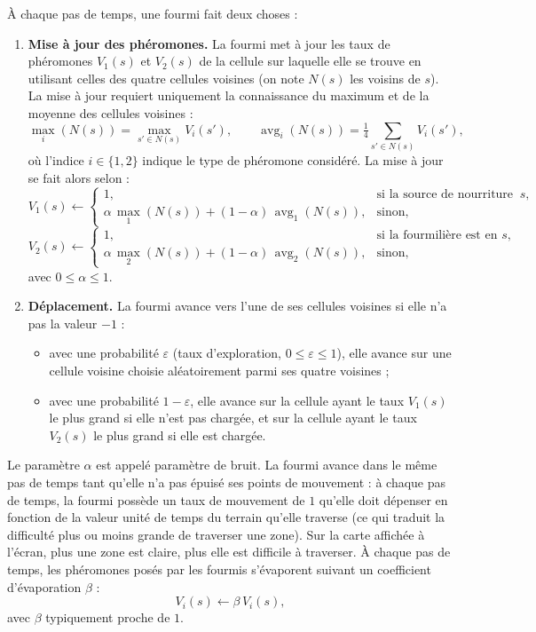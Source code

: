 \documentclass[11pt]{article}
\begin{document}
À chaque pas de temps, une fourmi fait deux choses :
\begin{enumerate}
  \item \textbf{Mise à jour des phéromones.} La fourmi met à jour les taux de phéromones $V_1(s)$ et $V_2(s)$ de la cellule sur laquelle elle se trouve en utilisant celles des quatre cellules voisines (on note $N(s)$ les voisins de $s$). La mise à jour requiert uniquement la connaissance du maximum et de la moyenne des cellules voisines :
  \[
    \max_i(N(s)) = \max_{s' \in N(s)} V_i(s'), \qquad \operatorname{avg}_i(N(s)) = \tfrac{1}{4} \sum_{s' \in N(s)} V_i(s') ,
  \]
  où l'indice $i \in \{1,2\}$ indique le type de phéromone considéré. La mise à jour se fait alors selon :
  \[
    V_1(s) \leftarrow
    \begin{cases}
      1, & \text{si la source de nourriture est en } s, \\
      \alpha\,\max_1(N(s)) + (1-\alpha)\,\operatorname{avg}_1(N(s)), & \text{sinon},
    \end{cases}
  \]
  \[
    V_2(s) \leftarrow
    \begin{cases}
      1, & \text{si la fourmilière est en } s, \\
      \alpha\,\max_2(N(s)) + (1-\alpha)\,\operatorname{avg}_2(N(s)), & \text{sinon},
    \end{cases}
  \]
  avec $0 \leq \alpha \leq 1$.

  \item \textbf{Déplacement.} La fourmi avance vers l'une de ses cellules voisines si elle n'a pas la valeur $-1$ :
  \begin{itemize}
    \item avec une probabilité $\varepsilon$ (taux d'exploration, $0 \leq \varepsilon \leq 1$), elle avance sur une cellule voisine choisie aléatoirement parmi ses quatre voisines ;
    \item avec une probabilité $1-\varepsilon$, elle avance sur la cellule ayant le taux $V_1(s)$ le plus grand si elle n'est pas chargée, et sur la cellule ayant le taux $V_2(s)$ le plus grand si elle est chargée.
  \end{itemize}
\end{enumerate}

Le paramètre $\alpha$ est appelé paramètre de bruit. La fourmi avance dans le même pas de temps tant qu'elle n'a pas épuisé ses points de mouvement : à chaque pas de temps, la fourmi possède un taux de mouvement de $1$ qu'elle doit dépenser en fonction de la valeur \og unité de temps \fg{} du terrain qu'elle traverse (ce qui traduit la difficulté plus ou moins grande de traverser une zone). Sur la carte affichée à l'écran, plus une zone est claire, plus elle est difficile à traverser. À chaque pas de temps, les phéromones posés par les fourmis s'évaporent suivant un coefficient d'évaporation $\beta$ :
\[
  V_i(s) \leftarrow \beta\,V_i(s),
\]
avec $\beta$ typiquement proche de $1$.
\end{document}

